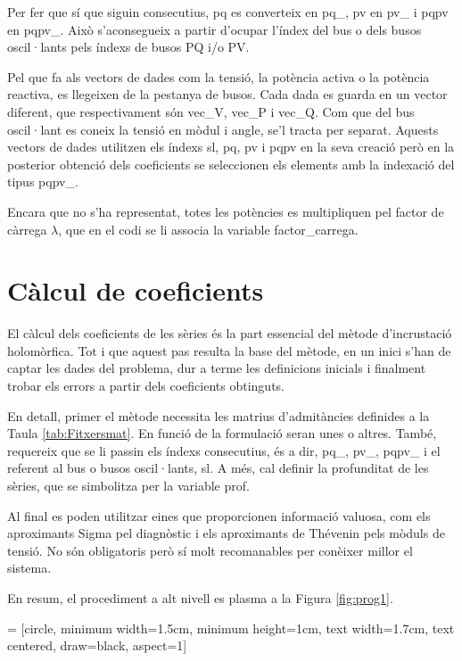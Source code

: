 Per fer que sí que siguin consecutius, pq es converteix en pq\_, pv en pv\_ i pqpv en pqpv\_. Això s'aconsegueix a partir d'ocupar l'índex del bus o dels busos oscil·lants pels índexs de busos PQ i/o PV.  

Pel que fa als vectors de dades com la tensió, la potència activa o la potència reactiva, es llegeixen de la pestanya de busos. Cada dada es guarda en un vector diferent, que respectivament són vec\_V, vec\_P i vec\_Q. Com que del bus oscil·lant es coneix la tensió en mòdul i angle, se'l tracta per separat. Aquests vectors de dades utilitzen els índexs sl, pq, pv i pqpv en la seva creació però en la posterior obtenció dels coeficients se seleccionen els elements amb la indexació del tipus pqpv\_. 

Encara que no s'ha representat, totes les potències es multipliquen pel factor de càrrega $\lambda$, que en el codi se li associa la variable factor\_carrega.

\section{Càlcul de coeficients}
El càlcul dels coeficients de les sèries és la part essencial del mètode d'incrustació holomòrfica. Tot i que aquest pas resulta la base del mètode, en un inici s'han de captar les dades del problema, dur a terme les definicions inicials i finalment trobar els errors a partir dels coeficients obtinguts. 

En detall, primer el mètode necessita les matrius d'admitàncies definides a la Taula \ref{tab:Fitxersmat}. En funció de la formulació seran unes o altres. També, requereix que se li passin els índexs consecutius, és a dir, pq\_, pv\_, pqpv\_ i el referent al bus o busos oscil·lants, sl. A més, cal definir la profunditat de les sèries, que se simbolitza per la variable prof. 

Al final es poden utilitzar eines que proporcionen informació valuosa, com els aproximants Sigma pel diagnòstic i els aproximants de Thévenin pels mòduls de tensió. No són obligatoris però sí molt recomanables per conèixer millor el sistema.

En resum, el procediment a alt nivell es plasma a la Figura \ref{fig:prog1}.

 = [circle, minimum width=1.5cm, minimum height=1cm, text width=1.7cm, text centered, draw=black, aspect=1]

